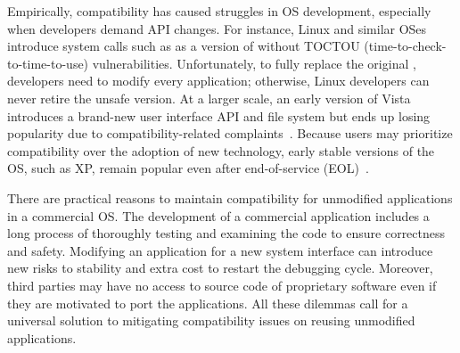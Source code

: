 Empirically, compatibility has caused struggles in OS development,
especially when developers demand API changes.
For instance, Linux and similar OSes
introduce system calls such as  as a version of 
without TOCTOU (time-to-check-to-time-to-use)
vulnerabilities.
Unfortunately,
to fully replace the original , developers need to modify every application; otherwise, Linux developers can never retire
the unsafe version.
At a larger scale, an early version of \win{} Vista introduces
a brand-new user interface API
and file system
but ends up losing popularity due to compatibility-related complaints~\cite{spolsky04microsoft-api-war}.
Because users may prioritize compatibility over the adoption of new technology,
early stable versions of the OS,
such as \win{} XP, remain popular even after end-of-service (EOL)~\cite{os-market-share}.


There are practical reasons
to maintain compatibility for unmodified applications in a commercial OS.
The development of a commercial application
includes a long process of thoroughly testing and examining the code to ensure correctness and safety.
Modifying an application for a new system interface
can introduce new risks to stability
and extra cost to restart the debugging cycle.
Moreover, third parties may have no access to source code of proprietary software even if they are motivated to port the applications.
All these dilemmas call for a universal solution
to mitigating
compatibility issues on reusing
unmodified applications.





